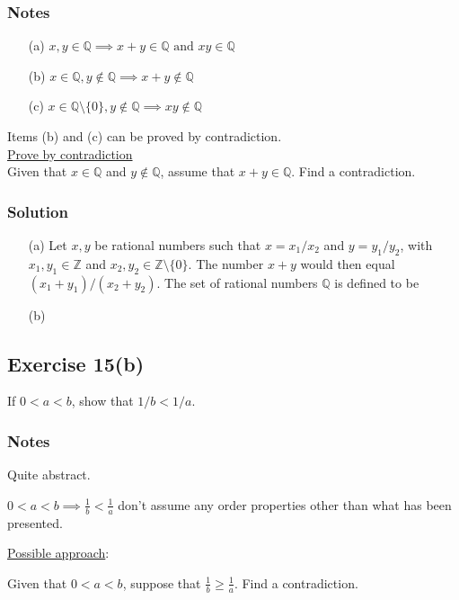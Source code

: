 \documentclass[12pt]{article}
\begin{document}
\begin{flushleft}
\subsubsection*{Notes}
\begin{itemize}
\item[(a)] $x, y \in \mathbb{Q} \implies x + y \in \mathbb{Q} \text{ and } xy \in \mathbb{Q}$
\item[(b)] $x \in \mathbb{Q}, y \notin \mathbb{Q} \implies x + y \notin \mathbb{Q}$
\item[(c)] $x \in \mathbb{Q} \setminus \{0\}, y \notin \mathbb{Q} \implies xy \notin \mathbb{Q}$
\end{itemize}
Items (b) and (c) can be proved by contradiction.\\
\underline{Prove by contradiction}\\
Given that $x \in \mathbb{Q}$ and $y \notin \mathbb{Q}$, assume that $x + y \in \mathbb{Q}$. Find a contradiction.

\subsubsection*{Solution}
\begin{itemize}
\item[(a)] Let $x, y$ be rational numbers such that $x = x_1 / x_2$ and $y = y_1 / y_2$, with $x_1, y_1 \in \mathbb{Z}$ and $x_2, y_2 \in \mathbb{Z} \setminus \{0\}$. The number $x + y$ would then equal $\left(x_1 + y_1\right)/\left(x_2 + y_2\right)$. The set of rational numbers $\mathbb{Q}$ is defined to be 

\item[(b)]
\end{itemize}

\subsection*{Exercise 15(b)}
If $0 < a < b$, show that $1/b < 1/a$.

\subsubsection*{Notes}
Quite abstract.

$0 < a < b \implies \frac{1}{b} < \frac{1}{a}$ don't assume any order properties other than what has been presented.

\underline{Possible approach}:

Given that $0 < a < b$, suppose that $\frac{1}{b} \geq \frac{1}{a}$. Find a contradiction.


\end{flushleft}
\end{document}
